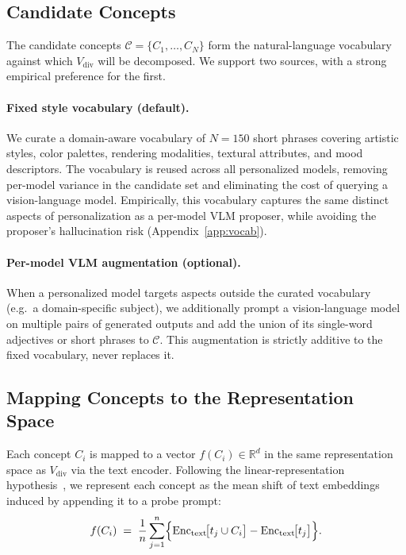 \subsection{Candidate Concepts}
\label{sec:concepts}

The candidate concepts $\mathcal{C}=\{C_1,\dots,C_N\}$ form the natural-language
vocabulary against which $V_{\mathrm{div}}$ will be decomposed. We support two
sources, with a strong empirical preference for the first.

\paragraph{Fixed style vocabulary (default).}
We curate a domain-aware vocabulary of $N{=}150$ short phrases covering
artistic styles, color palettes, rendering modalities, textural attributes,
and mood descriptors. The vocabulary is reused across all personalized
models, removing per-model variance in the candidate set and eliminating the
cost of querying a vision-language model. Empirically, this vocabulary
captures the same distinct aspects of personalization as a per-model VLM
proposer, while avoiding the proposer's hallucination risk
(Appendix~\ref{app:vocab}).

\paragraph{Per-model VLM augmentation (optional).}
When a personalized model targets aspects outside the curated vocabulary
(e.g.\ a domain-specific subject), we additionally prompt a vision-language
model on multiple pairs of generated outputs and add the union of its
single-word adjectives or short phrases to $\mathcal{C}$. This augmentation
is strictly additive to the fixed vocabulary, never replaces it.

\subsection{Mapping Concepts to the Representation Space}
\label{sec:fC}

Each concept $C_i$ is mapped to a vector $f(C_i)\in\mathbb{R}^d$ in the same
representation space as $V_{\mathrm{div}}$ via the text encoder. Following
the linear-representation hypothesis~\cite{park2023linear}, we represent each
concept as the mean shift of text embeddings induced by appending it to a
probe prompt:
\begin{equation}
\label{eq:fC}
f(C_i) \;=\; \frac{1}{n}\sum_{j=1}^{n}
\Bigl\{
  \mathrm{Enc}_{\mathrm{text}}\!\bigl[t_j \cup C_i\bigr]
  -
  \mathrm{Enc}_{\mathrm{text}}\!\bigl[t_j\bigr]
\Bigr\}.
\end{equation}

